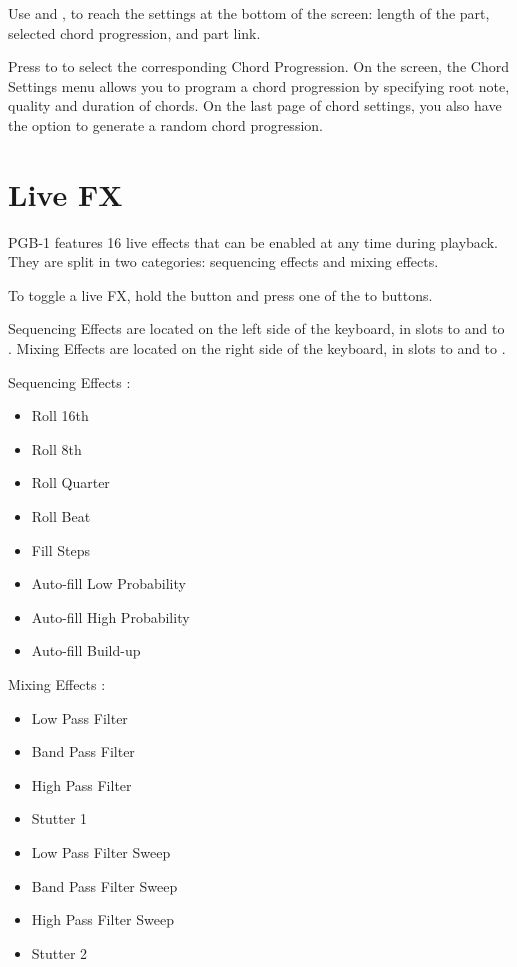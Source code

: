 \documentclass[8pt]{extarticle}
\def\device{PGB-1 }
\begin{document}
\begin{multicols*}{3}
Use  and , to reach the settings at the bottom of the screen: length of the part, selected chord progression, and part link.

\hfill

Press  to  to select the corresponding Chord Progression. On the screen, the Chord Settings menu allows you to program a chord progression by specifying root note, quality and duration of chords. On the last page of chord settings, you also have the option to generate a random chord progression.

\section{Live FX}

\device features 16 live effects that can be enabled at any time during playback. They are split in two categories: sequencing effects and mixing effects.

To toggle a live FX, hold the  button and press one of the  to  buttons.

Sequencing Effects are located on the left side of the keyboard, in slots  to  and  to .
Mixing Effects are located on the right side of the keyboard, in slots  to  and  to .

\begin{multicols}{2}
    Sequencing Effects :
    \begin{itemize}
    \item[\kbd{1}] Roll 16th
    \item[\kbd{2}] Roll 8th
    \item[\kbd{3}] Roll Quarter
    \item[\kbd{4}] Roll Beat
    \item[\kbd{9}] Fill Steps
    \item[\kbd{10}] Auto-fill Low Probability
    \item[\kbd{11}] Auto-fill High Probability
    \item[\kbd{12}] Auto-fill Build-up
    \end{itemize}

    \columnbreak

    Mixing Effects :
    \begin{itemize}
    \item[\kbd{5}] Low Pass Filter
    \item[\kbd{6}] Band Pass Filter
    \item[\kbd{7}] High Pass Filter
    \item[\kbd{8}] Stutter 1
    \item[\kbd{13}] Low Pass Filter Sweep
    \item[\kbd{14}] Band Pass Filter Sweep
    \item[\kbd{15}] High Pass Filter Sweep
    \item[\kbd{16}] Stutter 2
    \end{itemize}
\end{multicols}


\end{multicols*}
\end{document}
